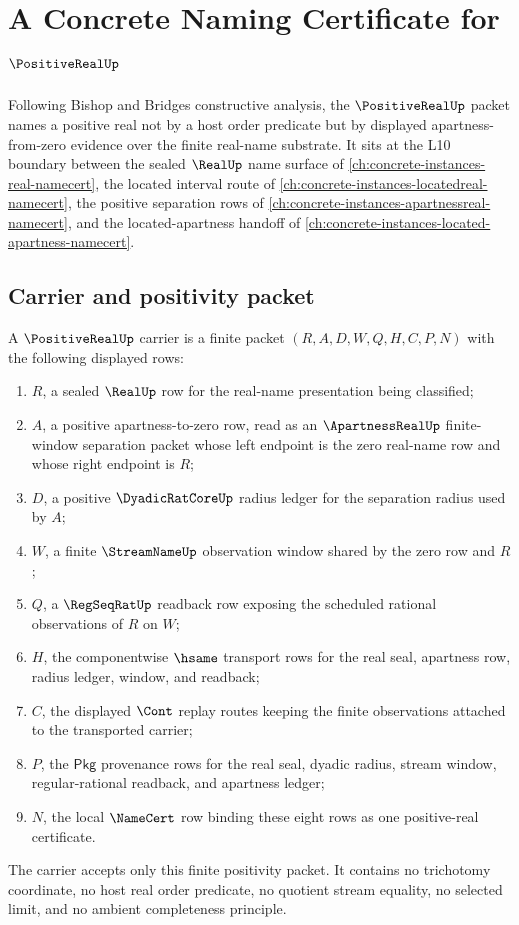\chapter{A Concrete Naming Certificate for $\PositiveRealUp$}
\label{ch:concrete-instances-positivereal-namecert}

Following Bishop and Bridges constructive analysis, the $\PositiveRealUp$
packet names a positive real not by a host order predicate but by displayed
apartness-from-zero evidence over the finite real-name substrate. It sits at
the L10 boundary between the sealed $\RealUp$ name surface of
\autoref{ch:concrete-instances-real-namecert}, the located interval route of
\autoref{ch:concrete-instances-locatedreal-namecert}, the positive separation
rows of \autoref{ch:concrete-instances-apartnessreal-namecert}, and the
located-apartness handoff of
\autoref{ch:concrete-instances-located-apartness-namecert}.

\section{Carrier and positivity packet}
\label{sec:positivereal-carrier}

\begin{definition}
\label{def:positivereal-carrier}
A $\PositiveRealUp$ carrier is a finite packet
$(R,A,D,W,Q,H,C,P,N)$ with the following displayed rows:
\begin{enumerate}
\item $R$, a sealed $\RealUp$ row for the real-name presentation being
classified;
\item $A$, a positive apartness-to-zero row, read as an
$\ApartnessRealUp$ finite-window separation packet whose left endpoint is the
zero real-name row and whose right endpoint is $R$;
\item $D$, a positive $\DyadicRatCoreUp$ radius ledger for the separation
radius used by $A$;
\item $W$, a finite $\StreamNameUp$ observation window shared by the zero row
and $R$;
\item $Q$, a $\RegSeqRatUp$ readback row exposing the scheduled rational
observations of $R$ on $W$;
\item $H$, the componentwise $\hsame$ transport rows for the real seal,
apartness row, radius ledger, window, and readback;
\item $C$, the displayed $\Cont$ replay routes keeping the finite observations
attached to the transported carrier;
\item $P$, the $\mathsf{Pkg}$ provenance rows for the real seal, dyadic
radius, stream window, regular-rational readback, and apartness ledger;
\item $N$, the local $\NameCert$ row binding these eight rows as one
positive-real certificate.
\end{enumerate}
The carrier accepts only this finite positivity packet. It contains no
trichotomy coordinate, no host real order predicate, no quotient stream
equality, no selected limit, and no ambient completeness principle.
\end{definition}

